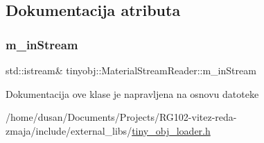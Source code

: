 \subsection{Dokumentacija atributa}
\mbox{\label{classtinyobj_1_1MaterialStreamReader_a8de39704770b77d36d6cebe09d941435}} 
\subsubsection{\texorpdfstring{m\+\_\+in\+Stream}{m\_inStream}}
{\footnotesize\ttfamily std\+::istream\& tinyobj\+::\+Material\+Stream\+Reader\+::m\+\_\+in\+Stream\hspace{0.3cm}{\ttfamily [private]}}



Dokumentacija ove klase je napravljena na osnovu datoteke \begin{DoxyCompactItemize}
\item 
/home/dusan/\+Documents/\+Projects/\+R\+G102-\/vitez-\/reda-\/zmaja/include/external\+\_\+libs/\hyperlink{tiny__obj__loader_8h}{tiny\+\_\+obj\+\_\+loader.\+h}\end{DoxyCompactItemize}
